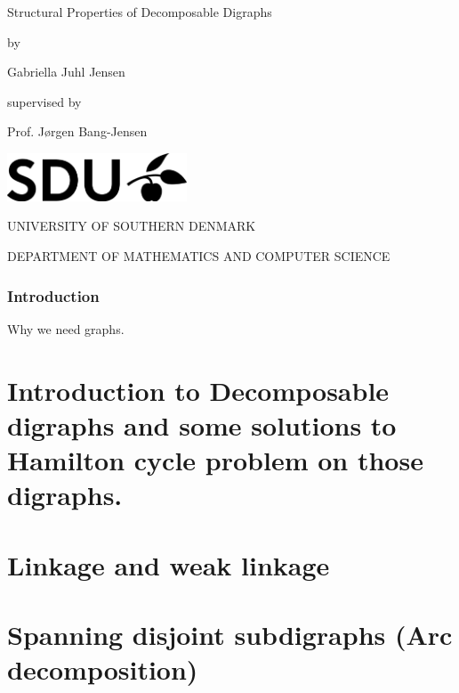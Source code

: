 \documentclass[11pt,oneside,a4paper]{report}
\begin{document}
\begin{titlepage}
	\begin{center}
		\vspace*{1cm}
		\huge{Structural Properties of Decomposable Digraphs}
		
		\vspace*{0.5cm}
		\large{by}
		
		\vspace{0.5cm}
		\Large{Gabriella Juhl Jensen}
		
		\vspace*{0.5cm}
		\normalsize{supervised by}
		
		\vspace{0.5cm}
		\large{Prof. Jørgen Bang-Jensen}
		
		\vfill
		
		\vspace*{0.7cm}
		\includegraphics[width=0.4\textwidth]{sdulogo}
		
		\vspace*{1cm}
		\MakeUppercase{University of southern Denmark}
		
		\vspace*{0.3cm}
		\MakeUppercase{Department of mathematics and computer science}
		
		\vspace*{0.3cm}
		\large{}
	\end{center}
\end{titlepage}
\tableofcontents
	\section{Introduction}
	Why we need graphs.
	\part{Introduction to Decomposable digraphs and some solutions to Hamilton cycle problem on those digraphs.}
	
	\clearpage
	\part{Linkage and weak linkage}
	
	\clearpage
	\part{Spanning disjoint subdigraphs (Arc decomposition)}
	\clearpage


\end{document}
